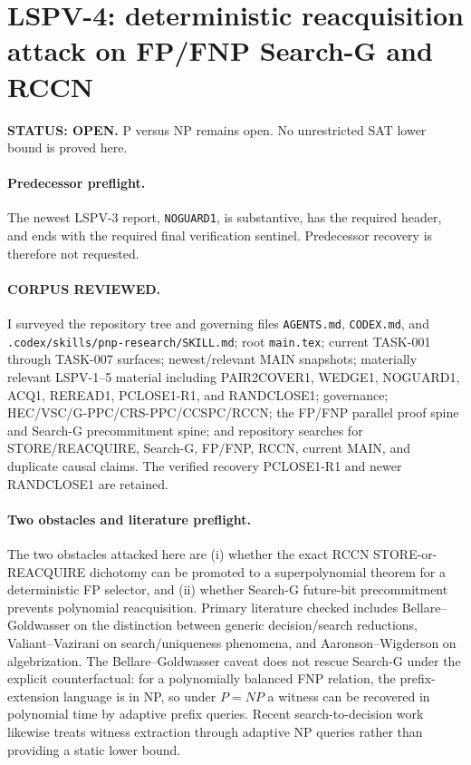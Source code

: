 \documentclass[11pt]{article}
\begin{document}
\section*{LSPV-4: deterministic reacquisition attack on FP/FNP Search-G and RCCN}
\textbf{STATUS: OPEN.} P versus NP remains open. No unrestricted SAT lower bound is proved here.

\paragraph{Predecessor preflight.}
The newest LSPV-3 report, \texttt{NOGUARD1}, is substantive, has the required header, and ends with the required final verification sentinel. Predecessor recovery is therefore not requested.

\paragraph{CORPUS REVIEWED.}
I surveyed the repository tree and governing files \texttt{AGENTS.md}, \texttt{CODEX.md}, and \texttt{.codex/skills/pnp-research/SKILL.md}; root \texttt{main.tex}; current TASK-001 through TASK-007 surfaces; newest/relevant MAIN snapshots; materially relevant LSPV-1--5 material including PAIR2COVER1, WEDGE1, NOGUARD1, ACQ1, REREAD1, PCLOSE1-R1, and RANDCLOSE1; governance; HEC/VSC/G-PPC/CRS-PPC/CCSPC/RCCN; the FP/FNP parallel proof spine and Search-G precommitment spine; and repository searches for STORE/REACQUIRE, Search-G, FP/FNP, RCCN, current MAIN, and duplicate causal claims. The verified recovery PCLOSE1-R1 and newer RANDCLOSE1 are retained.

\paragraph{Two obstacles and literature preflight.}
The two obstacles attacked here are (i) whether the exact RCCN STORE-or-REACQUIRE dichotomy can be promoted to a superpolynomial theorem for a deterministic FP selector, and (ii) whether Search-G future-bit precommitment prevents polynomial reacquisition. Primary literature checked includes Bellare--Goldwasser on the distinction between generic decision/search reductions, Valiant--Vazirani on search/uniqueness phenomena, and Aaronson--Wigderson on algebrization. The Bellare--Goldwasser caveat does not rescue Search-G under the explicit counterfactual: for a polynomially balanced FNP relation, the prefix-extension language is in NP, so under $P=NP$ a witness can be recovered in polynomial time by adaptive prefix queries. Recent search-to-decision work likewise treats witness extraction through adaptive NP queries rather than providing a static lower bound.
\end{document}
